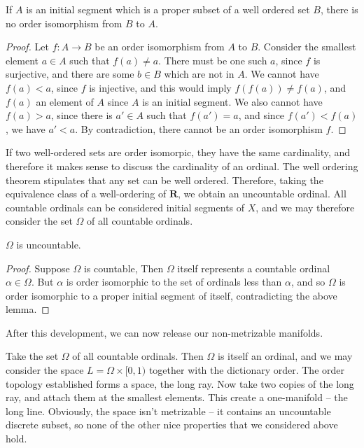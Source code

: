 \begin{lemma}
    If $A$ is an initial segment which is a proper subset of a well ordered set $B$, there is no order isomorphism from $B$ to $A$.
\end{lemma}
\begin{proof}
    Let $f:A \to B$ be an order isomorphism from $A$ to $B$. Consider the smallest element $a \in A$ such that $f(a) \neq a$. There must be one such $a$, since $f$ is surjective, and there are some $b \in B$ which are not in $A$. We cannot have $f(a) < a$, since $f$ is injective, and this would imply $f(f(a)) \neq f(a)$, and $f(a)$ an element of $A$ since $A$ is an initial segment. We also cannot have $f(a) > a$, since there is $a' \in A$ such that $f(a') = a$, and since $f(a') < f(a)$, we have $a' < a$. By contradiction, there cannot be an order isomorphism $f$.
\end{proof}

If two well-ordered sets are order isomorpic, they have the same cardinality, and therefore it makes sense to discuss the cardinality of an ordinal. The well ordering theorem stipulates that any set can be well ordered. Therefore, taking the equivalence class of a well-ordering of $\mathbf{R}$, we obtain an uncountable ordinal. All countable ordinals can be considered initial segments of $X$, and we may therefore consider the set $\Omega$ of all countable ordinals.

\begin{theorem}
    $\Omega$ is uncountable.
\end{theorem}
\begin{proof}
    Suppose $\Omega$ is countable, Then $\Omega$ itself represents a countable ordinal $\alpha \in \Omega$. But $\alpha$ is order isomorphic to the set of ordinals less than $\alpha$, and so $\Omega$ is order isomorphic to a proper initial segment of itself, contradicting the above lemma.
\end{proof}

After this development, we can now release our non-metrizable manifolds.

\begin{example}
    Take the set $\Omega$ of all countable ordinals. Then $\Omega$ is itself an ordinal, and we may consider the space $L = \Omega \times [0,1)$ together with the dictionary order. The order topology established forms a space, the long ray. Now take two copies of the long ray, and attach them at the smallest elements. This create a one-manifold -- the long line. Obviously, the space isn't metrizable -- it contains an uncountable discrete subset, so none of the other nice properties that we considered above hold.
\end{example}

